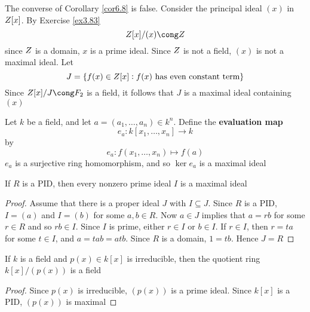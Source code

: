 \documentclass[11pt]{article}
\begin{document}
\begin{examplle}[]
The converse of Corollary \ref{cor6.8} is false. Consider the principal ideal
\((x)\) in \(\relax{Z}[x]\). By Exercise \ref{ex3.83}
\begin{equation*}
\Z[x]/(x)\cong\Z
\end{equation*}
since \(\relax{Z}\) is a domain, \(x\) is a prime ideal. Since \(\relax{Z}\) is not a field,
\((x)\) is not a maximal ideal. Let 
\begin{equation*}
J=\{f(x)\in\relax{Z}[x]:f(x)\text{ has even constant term}\}
\end{equation*}
Since \(\Z[x]/J\cong\F_2\) is a field, it follows that \(J\) is a maximal ideal
containing \((x)\)
\end{examplle}

\begin{examplle}[]
Let \(k\) be a field, and let \(a=(a_1,\dots,a_n)\in k^n\). Define the
\textbf{evaluation map}
\begin{equation*}
e_a:k[x_1,\dots,x_n]\to k
\end{equation*}
by
\begin{equation*}
e_a:f(x_1,\dots,x_n)\mapsto f(a)
\end{equation*}
\(e_a\) is a surjective ring homomorphism, and so \(\ker e_a\) is a maximal
ideal
\end{examplle}

\begin{theorem}[]
If \(R\) is a PID, then every nonzero prime ideal \(I\) is a maximal ideal
\end{theorem}

\begin{proof}
Assume that there is a proper ideal \(J\) with \(I\subseteq J\). Since \(R\) is a
PID, \(I=(a)\) and \(I=(b)\) for some \(a,b\in R\). Now \(a\in J\) implies
that \(a=rb\) for some \(r\in R\) and so \(rb\in I\). Since \(I\) is prime,
either \(r\in I\) or \(b\in I\). If \(r\in I\), then \(r=ta\) for some 
\(t\in I\), and \(a=tab=atb\). Since \(R\) is a domain, \(1=tb\). Hence \(J=R\)
\end{proof}

\begin{corollary}[]
If \(k\) is a field and \(p(x)\in k[x]\) is irreducible, then the quotient ring 
\(k[x]/(p(x))\) is a field
\end{corollary}

\begin{proof}
Since \(p(x)\) is irreducible, \((p(x))\) is a prime ideal. Since \(k[x]\) is
a PID, \((p(x))\) is maximal
\end{proof}
\end{document}
